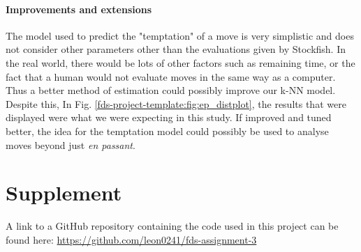 \documentclass[10pt,a4paper]{article}
\begin{document}
\begin{multicols}{2}
\paragraph{Improvements and extensions}

The model used to predict the "temptation" of a move is very simplistic and does not consider other parameters other than the evaluations given by Stockfish. In the real world, there would be lots of other factors such as remaining time, or the fact that a human would not evaluate moves in the same way as a computer. Thus a better method of estimation could possibly improve our k-NN model. Despite this, In Fig. \ref{fds-project-template:fig:ep_distplot}, the results that were displayed were what we were expecting in this study. If improved and tuned better, the idea for the temptation model could possibly be used to analyse moves beyond just \textit{en passant}.

\end{multicols}

\printbibliography
\section{Supplement}
A link to a GitHub repository containing the code used in this project can be found here:\newline
\href{https://github.com/leon0241/fds-assignment-3}{https://github.com/leon0241/fds-assignment-3}
\end{document}
